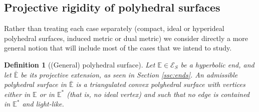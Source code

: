 \documentclass[notitlepage,twoside,a4paper]{amsart}
\newtheorem{definition}[theorem]{\rm\bf Definition}
\theoremstyle{named}
\newcommand{\bE}{{\mathbb E}}
\newcommand{\cE}{{\mathcal E}}
\newcommand{\cT}{{\mathcal T}}
\begin{document}

\subsection{Projective rigidity of polyhedral surfaces}
\label{ssc:prorig}

Rather than treating each case separately (compact, ideal or hyperideal polyhedral surfaces, induced metric or dual metric) we consider directly a more general notion that will include most of the cases that we intend to study.

\begin{definition}[(General) polyhedral surface]
  Let $\bE\in \cE_S$ be a hyperbolic end, and let $\bar \bE$ be its projective extension, as seen in Section \ref{ssc:ends}. An {\em admissible polyhedral surface} in $\bar \bE$ is a triangulated convex polyhedral surface with vertices either in $\bE$ or in $\bE^*$ (that is, no ideal vertex) and such that no edge is contained in $\bE^*$ and light-like.
\end{definition}
\end{document}
